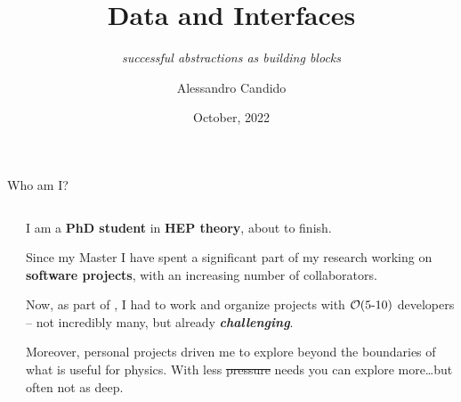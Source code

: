 \documentclass[9pt]{beamer}
\title{Data and Interfaces}
\subtitle{
    \itshape
    successful abstractions as building blocks
}
\date{October, 2022}
\author{Alessandro Candido}
\begin{document}
\maketitle



\begin{frame}{Who am I?}
    \vspace*{30pt}
    \begin{columns}
        \begin{column}{0.03\textwidth}
        \end{column}
        \begin{column}{0.47\textwidth}
            I am a \textbf{PhD student} in \textbf{HEP theory}, about to
            finish.\newline

            Since my Master I have spent a significant part of my research
            working on \alert{\textbf{software projects}}, with an increasing
            number of collaborators.\newline

            \vspace*{5pt}
            \vspace*{5pt}

            Now, as part of \nnpdf{}, I had to work and organize projects with
            $\order{5\text{-}10}$ developers -- not incredibly many, but already
            \textit{\textbf{challenging}}.\newline

            Moreover, personal projects driven me to explore beyond the
            boundaries of what is useful for physics.
            With less \sout{pressure} needs you can explore more\dots but often
            not as deep.\newline

            \vspace*{5pt}
            \vspace*{5pt}


\end{column}
\end{columns}
\end{frame}
\end{document}
